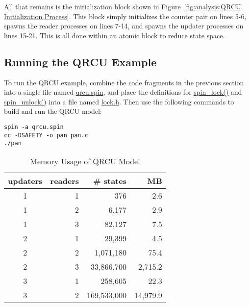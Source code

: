 All that remains is the initialization block shown in
Figure~\ref{fig:analysis:QRCU Initialization Process}.
This block simply initializes the counter pair on lines 5-6,
spawns the reader processes on lines 7-14, and spawns the updater
processes on lines 15-21.
This is all done within an atomic block to reduce state space.

\subsection{Running the QRCU Example}
\label{app:formal:Running the QRCU Example}

To run the QRCU example, combine the code fragments in the previous
section into a single file named \url{qrcu.spin}, and place the definitions
for \url{spin_lock()} and \url{spin_unlock()} into a file named
\url{lock.h}.
Then use the following commands to build and run the QRCU model:

\vspace{5pt}
\begin{minipage}[t]{\columnwidth}
\begin{verbatim}
spin -a qrcu.spin
cc -DSAFETY -o pan pan.c
./pan
\end{verbatim}
\end{minipage}
\vspace{5pt}

\begin{table}
\begin{center}
\begin{tabular}{c|r|r|r}
	updaters &
	    readers &
		   \# states & MB \\
	\hline
	1 & 1 &         376 &      2.6 \\
	\hline
	1 & 2 &       6,177 &      2.9 \\
	\hline
	1 & 3 &      82,127 &      7.5 \\
	\hline
	2 & 1 &      29,399 &      4.5 \\
	\hline
	2 & 2 &   1,071,180 &     75.4 \\
	\hline
	2 & 3 &  33,866,700 &  2,715.2 \\
	\hline
	3 & 1 &     258,605 &     22.3 \\
	\hline
	3 & 2 & 169,533,000 & 14,979.9 \\
\end{tabular}
\end{center}
\caption{Memory Usage of QRCU Model}
\label{tab:advsync:Memory Usage of QRCU Model}
\end{table}

